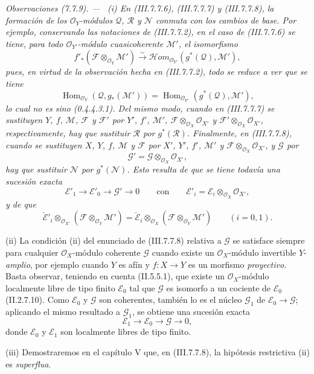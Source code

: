 \documentclass[10pt,oneside]{book}
\newcommand{\sref}[2][]{\textup{(#2)}}
\newcommand{\oldpage}[2][]{\setcounter{footnote}{0}\marginpar{\scriptsize\textbf{#1}~|~#2}\ignorespaces}
\newenvironment{remarks}[1][]{\par\medskip\noindent\itshape Observaciones (#1). ---\ }{\par}
\begin{document}
\oldpage[III]{203}
\begin{remarks}[7.7.9]
\label{III.7.7.9}
\textnormal{(i)} En \sref{III.7.7.6}, \sref{III.7.7.7} y
\sref{III.7.7.8}, la formación de los $\mathscr O_Y$-módulos $\mathscr Q$,
$\mathscr R$ y $\mathscr N$ \emph{conmuta con los cambios de base}. Por ejemplo,
conservando las notaciones de \sref{III.7.7.2}, en el caso de
\sref{III.7.7.6} se tiene, para todo $\mathscr O_{Y'}$-módulo cuasicoherente
$\mathscr M'$, el isomorfismo
\[
  f'_*(\mathscr F\otimes_{\mathscr O_Y}\mathscr M')
  \xrightarrow{\sim}
  \mathscr{H}\!om_{\mathscr O_{Y'}}(g^*(\mathscr Q),\mathscr M'),
\]
pues, en virtud de la observación hecha en \sref{III.7.7.2}, todo se reduce a
ver que se tiene
\[
  \operatorname{Hom}_{\mathscr O_Y}(\mathscr Q,g_*(\mathscr M'))
  =
  \operatorname{Hom}_{\mathscr O_{Y'}}(g^*(\mathscr Q),\mathscr M'),
\]
lo cual no es sino \sref[0]{0.4.4.3.1}. Del mismo modo, cuando en
\sref{III.7.7.7} se sustituyen $Y$, $f$, $\mathscr M$, $\mathscr F$ y
$\mathscr F'$ por $Y'$, $f'$, $\mathscr M'$,
$\mathscr F\otimes_{\mathscr O_X}\mathscr O_{X'}$ y
$\mathscr F'\otimes_{\mathscr O_X}\mathscr O_{X'}$, respectivamente, hay que
sustituir $\mathscr R$ por $g^*(\mathscr R)$. Finalmente, en
\sref{III.7.7.8}, cuando se sustituyen $X$, $Y$, $f$, $\mathscr M$ y
$\mathscr F$ por $X'$, $Y'$, $f'$, $\mathscr M'$ y
$\mathscr F\otimes_{\mathscr O_X}\mathscr O_{X'}$, y $\mathscr G$ por
\[
  \mathscr G'=\mathscr G\otimes_{\mathscr O_X}\mathscr O_{X'},
\]
hay que sustituir $\mathscr N$ por $g^*(\mathscr N)$. Esto resulta de que se
tiene todavía una sucesión exacta
\[
  \mathscr E'_1\longrightarrow
  \mathscr E'_0\longrightarrow
  \mathscr G'\longrightarrow0
  \qquad\text{con}\qquad
  \mathscr E'_i=\mathscr E_i\otimes_{\mathscr O_X}\mathscr O_{X'},
\]
y de que
\[
  \check{\mathscr E}'_i
  \otimes_{\mathscr O_{X'}}
  (\mathscr F\otimes_{\mathscr O_Y}\mathscr M')
  =
  \check{\mathscr E}_i
  \otimes_{\mathscr O_X}
  (\mathscr F\otimes_{\mathscr O_Y}\mathscr M')
  \qquad(i=0,1).
\]

\medskip
\textnormal{(ii)} La condición (ii) del enunciado de \sref{III.7.7.8}
relativa a $\mathscr G$ se satisface siempre para cualquier
$\mathscr O_X$-módulo coherente $\mathscr G$ cuando existe un
$\mathscr O_X$-módulo invertible $Y$-\emph{amplio}, por ejemplo cuando $Y$ es afín y
$f:X\to Y$ es un morfismo \emph{proyectivo}. Basta observar, teniendo en cuenta
\sref[II]{II.5.5.1}, que existe un $\mathscr O_X$-módulo localmente libre de
tipo finito $\mathscr E_0$ tal que $\mathscr G$ es isomorfo a un cociente de
$\mathscr E_0$ \sref[II]{II.2.7.10}. Como $\mathscr E_0$ y $\mathscr G$ son
coherentes, también lo es el núcleo $\mathscr G_1$ de
$\mathscr E_0\to\mathscr G$; aplicando el mismo resultado a $\mathscr G_1$, se
obtiene una sucesión exacta
\[
  \mathscr E_1\longrightarrow
  \mathscr E_0\longrightarrow
  \mathscr G\longrightarrow0,
\]
donde $\mathscr E_0$ y $\mathscr E_1$ son localmente libres de tipo finito.

\medskip
\textnormal{(iii)} Demostraremos en el capítulo V que, en
\sref{III.7.7.8}, la hipótesis restrictiva (ii) es \emph{superflua}.
\end{remarks}
\end{document}
